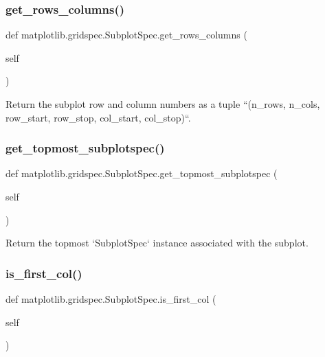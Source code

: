 \subsubsection{\texorpdfstring{get\+\_\+rows\+\_\+columns()}{get\_rows\_columns()}}
{\footnotesize\ttfamily def matplotlib.\+gridspec.\+Subplot\+Spec.\+get\+\_\+rows\+\_\+columns (\begin{DoxyParamCaption}\item[{}]{self }\end{DoxyParamCaption})}

\begin{DoxyVerb}Return the subplot row and column numbers as a tuple
``(n_rows, n_cols, row_start, row_stop, col_start, col_stop)``.
\end{DoxyVerb}
 \mbox{\label{classmatplotlib_1_1gridspec_1_1SubplotSpec_a5abffd71d91ce525b32c0e3ec78d6877}} 
\subsubsection{\texorpdfstring{get\+\_\+topmost\+\_\+subplotspec()}{get\_topmost\_subplotspec()}}
{\footnotesize\ttfamily def matplotlib.\+gridspec.\+Subplot\+Spec.\+get\+\_\+topmost\+\_\+subplotspec (\begin{DoxyParamCaption}\item[{}]{self }\end{DoxyParamCaption})}

\begin{DoxyVerb}Return the topmost `SubplotSpec` instance associated with the subplot.
\end{DoxyVerb}
 \mbox{\label{classmatplotlib_1_1gridspec_1_1SubplotSpec_a6a2f63444c89f715e5a301f675fa25ad}} 
\subsubsection{\texorpdfstring{is\+\_\+first\+\_\+col()}{is\_first\_col()}}
{\footnotesize\ttfamily def matplotlib.\+gridspec.\+Subplot\+Spec.\+is\+\_\+first\+\_\+col (\begin{DoxyParamCaption}\item[{}]{self }\end{DoxyParamCaption})}

